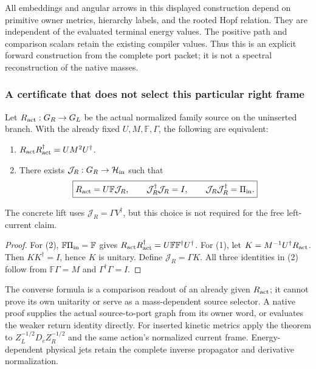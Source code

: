 \documentclass[12pt,a4paper]{article}
\begin{document}
All embeddings and angular arrows in this displayed construction depend on
primitive owner metrics, hierarchy labels, and the rooted Hopf relation.
They are independent of the evaluated terminal energy values. The positive
path and comparison scalars retain the existing compiler values. Thus this
is an explicit forward construction from the complete port packet; it is
not a spectral reconstruction of the native masses.

\subsubsection{A certificate that does not select this particular right frame}
\begin{theorem}
\label{p6:thm:v2168-unit-support-equivalence}
Let $R_{\rm act}:G_R\to G_L$ be the actual normalized family source on the
uninserted branch. With the already fixed $U,M,\mathbb F,\Gamma$, the following
are equivalent:
\begin{enumerate}
\item $R_{\rm act}R_{\rm act}^\dagger=UM^2U^\dagger$.
\item There exists $\mathcal J_R:G_R\to\mathcal H_{\rm in}$ such that
\[
 \boxed{R_{\rm act}=U\mathbb F\mathcal J_R,\qquad
 \mathcal J_R^\dagger\mathcal J_R=I,
 \qquad\mathcal J_R\mathcal J_R^\dagger=\Pi_{\rm in}.}
\]
\end{enumerate}
The concrete lift uses $\mathcal J_R=\Gamma V^\dagger$, but this choice is
not required for the free left-current claim.
\end{theorem}
\begin{proof}
For (2), $\mathbb F\Pi_{\rm in}=\mathbb F$ gives
$R_{\rm act}R_{\rm act}^\dagger=U\mathbb F\mathbb F^\dagger U^\dagger$.
For (1), let $K=M^{-1}U^\dagger R_{\rm act}$. Then $KK^\dagger=I$, hence
$K$ is unitary. Define $\mathcal J_R=\Gamma K$. All three identities in (2)
follow from $\mathbb F\Gamma=M$ and $\Gamma^\dagger\Gamma=I$.
\end{proof}

The converse formula is a comparison readout of an already given $R_{\rm act}$;
it cannot prove its own unitarity or serve as a mass-dependent source selector.
A native proof supplies the actual source-to-port graph from its owner word,
or evaluates the weaker return identity directly. For inserted kinetic metrics
apply the theorem to $Z_L^{-1/2}D_eZ_R^{-1/2}$ and the same action's normalized
current frame. Energy-dependent physical jets retain the complete inverse
propagator and derivative normalization.
\end{document}
